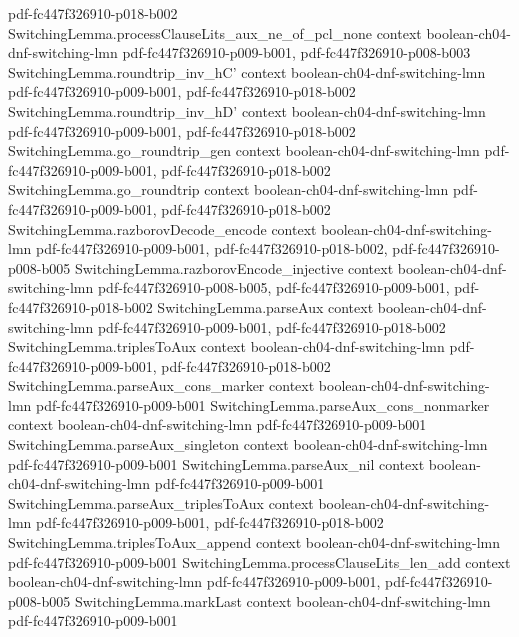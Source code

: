 \begin{theorem}
{    pdf-fc447f326910-p018-b002}
\proofstep
  {SwitchingLemma.processClauseLits_aux_ne_of_pcl_none}
  {context}
  {boolean-ch04-dnf-switching-lmn}
  {pdf-fc447f326910-p009-b001,
    pdf-fc447f326910-p008-b003}
\proofstep
  {SwitchingLemma.roundtrip_inv_hC'}
  {context}
  {boolean-ch04-dnf-switching-lmn}
  {pdf-fc447f326910-p009-b001,
    pdf-fc447f326910-p018-b002}
\proofstep
  {SwitchingLemma.roundtrip_inv_hD'}
  {context}
  {boolean-ch04-dnf-switching-lmn}
  {pdf-fc447f326910-p009-b001,
    pdf-fc447f326910-p018-b002}
\proofstep
  {SwitchingLemma.go_roundtrip_gen}
  {context}
  {boolean-ch04-dnf-switching-lmn}
  {pdf-fc447f326910-p009-b001,
    pdf-fc447f326910-p018-b002}
\proofstep
  {SwitchingLemma.go_roundtrip}
  {context}
  {boolean-ch04-dnf-switching-lmn}
  {pdf-fc447f326910-p009-b001,
    pdf-fc447f326910-p018-b002}
\proofstep
  {SwitchingLemma.razborovDecode_encode}
  {context}
  {boolean-ch04-dnf-switching-lmn}
  {pdf-fc447f326910-p009-b001,
    pdf-fc447f326910-p018-b002,
    pdf-fc447f326910-p008-b005}
\proofstep
  {SwitchingLemma.razborovEncode_injective}
  {context}
  {boolean-ch04-dnf-switching-lmn}
  {pdf-fc447f326910-p008-b005,
    pdf-fc447f326910-p009-b001,
    pdf-fc447f326910-p018-b002}
\proofstep
  {SwitchingLemma.parseAux}
  {context}
  {boolean-ch04-dnf-switching-lmn}
  {pdf-fc447f326910-p009-b001,
    pdf-fc447f326910-p018-b002}
\proofstep
  {SwitchingLemma.triplesToAux}
  {context}
  {boolean-ch04-dnf-switching-lmn}
  {pdf-fc447f326910-p009-b001,
    pdf-fc447f326910-p018-b002}
\proofstep
  {SwitchingLemma.parseAux_cons_marker}
  {context}
  {boolean-ch04-dnf-switching-lmn}
  {pdf-fc447f326910-p009-b001}
\proofstep
  {SwitchingLemma.parseAux_cons_nonmarker}
  {context}
  {boolean-ch04-dnf-switching-lmn}
  {pdf-fc447f326910-p009-b001}
\proofstep
  {SwitchingLemma.parseAux_singleton}
  {context}
  {boolean-ch04-dnf-switching-lmn}
  {pdf-fc447f326910-p009-b001}
\proofstep
  {SwitchingLemma.parseAux_nil}
  {context}
  {boolean-ch04-dnf-switching-lmn}
  {pdf-fc447f326910-p009-b001}
\proofstep
  {SwitchingLemma.parseAux_triplesToAux}
  {context}
  {boolean-ch04-dnf-switching-lmn}
  {pdf-fc447f326910-p009-b001,
    pdf-fc447f326910-p018-b002}
\proofstep
  {SwitchingLemma.triplesToAux_append}
  {context}
  {boolean-ch04-dnf-switching-lmn}
  {pdf-fc447f326910-p009-b001}
\proofstep
  {SwitchingLemma.processClauseLits_len_add}
  {context}
  {boolean-ch04-dnf-switching-lmn}
  {pdf-fc447f326910-p009-b001,
    pdf-fc447f326910-p008-b005}
\proofstep
  {SwitchingLemma.markLast}
  {context}
  {boolean-ch04-dnf-switching-lmn}
  {pdf-fc447f326910-p009-b001}

\end{theorem}
